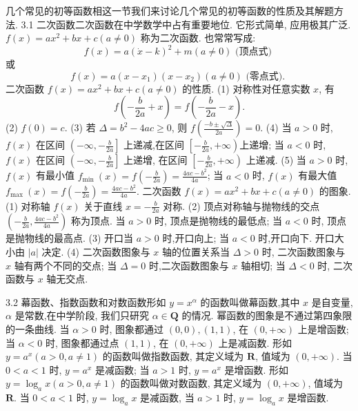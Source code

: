 
几个常见的初等函数相这一节我们来讨论几个常见的初等函数的性质及其解题方法.
3.1 二次函数二次函数在中学数学中占有重要地位.
它形式简单, 应用极其广泛.
$f(x)=a x^2+b x+c(a \neq 0)$ 称为二次函数.
也常常写成:
$$
f(x)=a(\dot{x}-k)^2+m(a \neq 0) \text { (顶点式) }
$$
或
$$
f(x)=a\left(x-x_1\right)\left(x-x_2\right)(a \neq 0) \text { (零点式). }
$$
二次函数 $f(x)=a x^2+b x+c(a \neq 0)$ 的性质.
(1) 对称性对任意实数 $x$, 有
$$
f\left(-\frac{b}{2 a}+x\right)=f\left(-\frac{b}{2 a}-x\right) .
$$
(2) $f(0)=c$.
(3) 若 $\Delta=b^2-4 a c \geqslant 0$, 则 $f\left(\frac{-b \pm \sqrt{\Delta}}{2 a}\right)=0$.
(4) 当 $a>0$ 时, $f(x)$ 在区间 $\left(-\infty,-\frac{b}{2 a}\right]$ 上递减,在区间 $\left[-\frac{b}{2 a},+\infty\right)$上递增;
当 $a<0$ 时, $f(x)$ 在区间 $\left(-\infty,-\frac{b}{2 a}\right]$ 上递增, 在区间 $\left[-\frac{b}{2 a},+\infty\right)$ 上递减.
(5) 当 $a>0$ 时, $f(x)$ 有最小值 $f_{\text {min }}(x)=f\left(-\frac{b}{2 a}\right)=\frac{4 a c-b^2}{4 a}$;
当 $a<0$ 时, $f(x)$ 有最大值 $f_{\text {max }}(x)=f\left(-\frac{b}{2 a}\right)=\frac{4 a c-b^2}{4 a}$.
二次函数 $f(x)=a x^2+b x+c(a \neq 0)$ 的图象.
(1) 对称轴 $f(x)$ 关于直线 $x=-\frac{b}{2 a}$ 对称.
(2) 顶点对称轴与抛物线的交点 $\left(-\frac{b}{2 a}, \frac{4 a c-b^2}{4 a}\right)$ 称为顶点.
当 $a>0$ 时, 顶点是抛物线的最低点; 当 $a<0$ 时, 顶点是抛物线的最高点.
(3) 开口当 $a>0$ 时,开口向上; 当 $a<0$ 时,开口向下.
开口大小由 $|a|$ 决定.
(4) 二次函数图象与 $x$ 轴的位置关系当 $\Delta>0$ 时, 二次函数图象与 $x$ 轴有两个不同的交点; 当 $\Delta=0$ 时,二次函数图象与 $x$ 轴相切; 当 $\Delta<0$ 时, 二次函数与 $x$ 轴无交点.



3.2 幕函数、指数函数和对数函数形如 $y=x^\alpha$ 的函数叫做幕函数,其中 $x$ 是自变量, $\alpha$ 是常数,在中学阶段, 我们只研究 $\alpha \in \mathbf{Q}$ 的情况.
幂函数的图象是不通过第四象限的一条曲线.
当 $\alpha>0$ 时, 图象都通过 $(0,0),(1,1)$, 在 $(0,+\infty)$ 上是增函数; 当 $\alpha<0$ 时, 图象都通过点 $(1,1)$, 在 $(0,+\infty)$ 上是减函数.
形如 $y=a^x(a>0, a \neq 1)$ 的函数叫做指数函数, 其定义域为 $\mathbf{R}$, 值域为 $(0,+\infty)$. 当 $0<a<1$ 时, $y=a^x$ 是减函数; 当 $a>1$ 时, $y=a^x$ 是增函数.
形如 $y=\log _a x(a>0, a \neq 1)$ 的函数叫做对数函数, 其定义域为 $(0 , +\infty)$, 值域为 $\mathbf{R}$. 当 $0<a<1$ 时, $y=\log _a x$ 是减函数, 当 $a>1$ 时, $y=\log _a x$ 是增函数.



